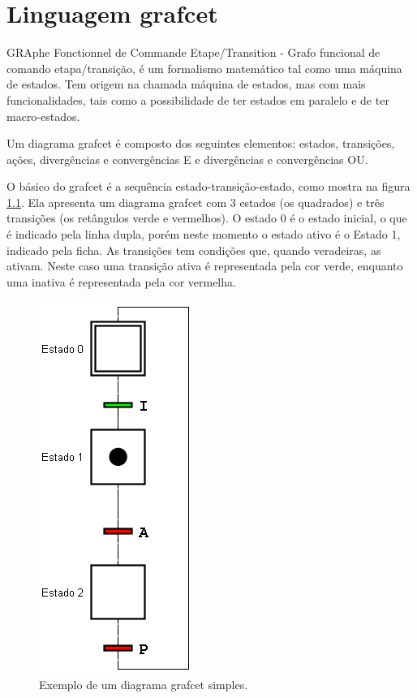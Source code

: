 \chapter{Linguagem grafcet}

GRAphe Fonctionnel de Commande Etape/Transition - Grafo funcional de comando etapa/transição, é um formalismo matemático tal como uma máquina de estados. Tem origem na chamada máquina de estados, mas com mais funcionalidades, tais como a possibilidade de ter estados em paralelo e de ter macro-estados.

Um diagrama grafcet é composto dos seguintes elementos: estados, transições, ações, divergências e convergências E e divergências e convergências OU.

O básico do grafcet é a sequência estado-transição-estado, como mostra na figura \ref{fig:grafcetSimples}. Ela apresenta um diagrama grafcet com 3 estados (os quadrados) e três transições (os retângulos verde e vermelhos). O estado 0 é o estado inicial, o que é indicado pela linha dupla, porém neste momento o estado ativo é o Estado 1, indicado pela ficha. As transições tem condições que, quando veradeiras, as ativam. Neste caso uma transição ativa é representada pela cor verde, enquanto uma inativa é representada pela cor vermelha.
\begin{figure}[hbt]
  \centering
  \includegraphics[scale=0.6]{figuras/grafcetSimples}
  \caption{Exemplo de um diagrama grafcet simples.}
  \label{fig:grafcetSimples}
\end{figure}

